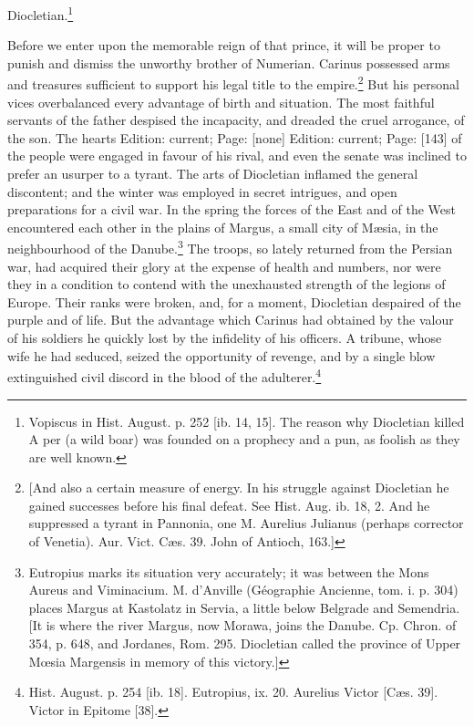 Diocletian.\footnote{Vopiscus in Hist. August. p. 252 [ib. 14, 15]. The reason why Diocletian killed A per (a wild boar) was founded on a prophecy and a pun, as foolish as they are well known.}

Before we enter upon the memorable reign of that prince, it will be proper to punish and dismiss the unworthy brother of Numerian. Carinus possessed arms and treasures sufficient to support his legal title to the empire.\footnote{[And also a certain measure of energy. In his struggle against Diocletian he gained successes before his final defeat. See Hist. Aug. ib. 18, 2. And he suppressed a tyrant in Pannonia, one M. Aurelius Julianus (perhaps corrector of Venetia). Aur. Vict. Cæs. 39. John of Antioch, 163.]} But his personal vices overbalanced every advantage of birth and situation. The most faithful servants of the father despised the incapacity, and dreaded the cruel arrogance, of the son. The hearts Edition: current; Page: [none] Edition: current; Page: [143] of the people were engaged in favour of his rival, and even the senate was inclined to prefer an usurper to a tyrant. The arts of Diocletian inflamed the general discontent; and the winter was employed in secret intrigues, and open preparations for a civil war. In the spring the forces of the East and of the West encountered each other in the plains of Margus, a small city of Mæsia, in the neighbourhood of the Danube.\footnote{Eutropius marks its situation very accurately; it was between the Mons Aureus and Viminacium. M. d\texthebrew{}’Anville (Géographie Ancienne, tom. i. p. 304) places Margus at Kastolatz in Servia, a little below Belgrade and Semendria. [It is where the river Margus, now Morawa, joins the Danube. Cp. Chron. of 354, p. 648, and Jordanes, Rom. 295. Diocletian called the province of Upper Mœsia Margensis in memory of this victory.]} The troops, so lately returned from the Persian war, had acquired their glory at the expense of health and numbers, nor were they in a condition to contend with the unexhausted strength of the legions of Europe. Their ranks were broken, and, for a moment, Diocletian despaired of the purple and of life. But the advantage which Carinus had obtained by the valour of his soldiers he quickly lost by the infidelity of his officers. A tribune, whose wife he had seduced, seized the opportunity of revenge, and by a single blow extinguished civil discord in the blood of the adulterer.\footnote{Hist. August. p. 254 [ib. 18]. Eutropius, ix. 20. Aurelius Victor [Cæs. 39]. Victor in Epitome [38].}

